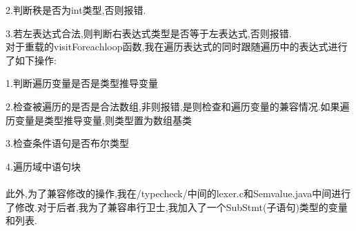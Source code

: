 \documentclass[UTF8]{ctexart}
\begin{document}
\par 2.判断秩是否为int类型,否则报错.
\par 3.若左表达式合法,则判断右表达式类型是否等于左表达式,否则报错.\\
对于重载的visitForeachloop函数,我在遍历表达式的同时跟随遍历中的表达式进行了如下操作:
\par 1.判断遍历变量是否是类型推导变量
\par 2.检查被遍历的是否是合法数组,非则报错,是则检查和遍历变量的兼容情况.如果遍历变量是类型推导变量,则类型置为数组基类
\par 3.检查条件语句是否布尔类型
\par 4.遍历域中语句块\\\\
此外,为了兼容修改的操作,我在/typecheck/中间的lexer.c和Semvalue.java中间进行了修改.对于后者,我为了兼容串行卫士,我加入了一个SubStmt(子语句)类型的变量和列表.\\
\end{document}
